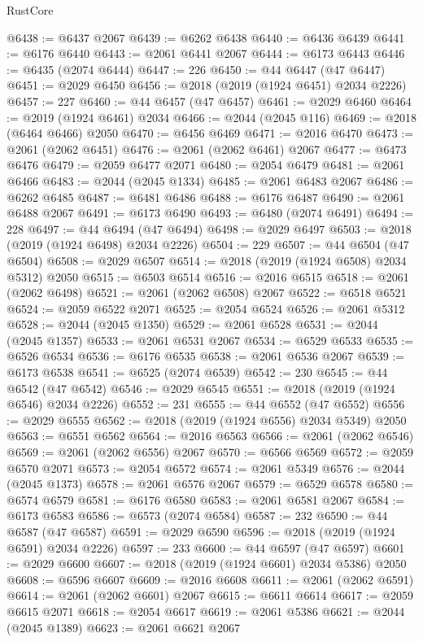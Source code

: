 \begin{lexlean}{RustCore}
\begin{coremodule}
@6438 := @6437 @2067
@6439 := @6262 @6438
@6440 := @6436 @6439
@6441 := @6176 @6440
@6443 := @2061 @6441 @2067
@6444 := @6173 @6443
@6446 := @6435 (@2074 @6444)
@6447 := 226
@6450 := @44 @6447 (@47 @6447)
@6451 := @2029 @6450
@6456 := @2018 (@2019 (@1924 @6451) @2034 @2226)
@6457 := 227
@6460 := @44 @6457 (@47 @6457)
@6461 := @2029 @6460
@6464 := @2019 (@1924 @6461) @2034
@6466 := @2044 (@2045 @116)
@6469 := @2018 (@6464 @6466) @2050
@6470 := @6456 @6469
@6471 := @2016 @6470
@6473 := @2061 (@2062 @6451)
@6476 := @2061 (@2062 @6461) @2067
@6477 := @6473 @6476
@6479 := @2059 @6477 @2071
@6480 := @2054 @6479
@6481 := @2061 @6466
@6483 := @2044 (@2045 @1334)
@6485 := @2061 @6483 @2067
@6486 := @6262 @6485
@6487 := @6481 @6486
@6488 := @6176 @6487
@6490 := @2061 @6488 @2067
@6491 := @6173 @6490
@6493 := @6480 (@2074 @6491)
@6494 := 228
@6497 := @44 @6494 (@47 @6494)
@6498 := @2029 @6497
@6503 := @2018 (@2019 (@1924 @6498) @2034 @2226)
@6504 := 229
@6507 := @44 @6504 (@47 @6504)
@6508 := @2029 @6507
@6514 := @2018 (@2019 (@1924 @6508) @2034 @5312) @2050
@6515 := @6503 @6514
@6516 := @2016 @6515
@6518 := @2061 (@2062 @6498)
@6521 := @2061 (@2062 @6508) @2067
@6522 := @6518 @6521
@6524 := @2059 @6522 @2071
@6525 := @2054 @6524
@6526 := @2061 @5312
@6528 := @2044 (@2045 @1350)
@6529 := @2061 @6528
@6531 := @2044 (@2045 @1357)
@6533 := @2061 @6531 @2067
@6534 := @6529 @6533
@6535 := @6526 @6534
@6536 := @6176 @6535
@6538 := @2061 @6536 @2067
@6539 := @6173 @6538
@6541 := @6525 (@2074 @6539)
@6542 := 230
@6545 := @44 @6542 (@47 @6542)
@6546 := @2029 @6545
@6551 := @2018 (@2019 (@1924 @6546) @2034 @2226)
@6552 := 231
@6555 := @44 @6552 (@47 @6552)
@6556 := @2029 @6555
@6562 := @2018 (@2019 (@1924 @6556) @2034 @5349) @2050
@6563 := @6551 @6562
@6564 := @2016 @6563
@6566 := @2061 (@2062 @6546)
@6569 := @2061 (@2062 @6556) @2067
@6570 := @6566 @6569
@6572 := @2059 @6570 @2071
@6573 := @2054 @6572
@6574 := @2061 @5349
@6576 := @2044 (@2045 @1373)
@6578 := @2061 @6576 @2067
@6579 := @6529 @6578
@6580 := @6574 @6579
@6581 := @6176 @6580
@6583 := @2061 @6581 @2067
@6584 := @6173 @6583
@6586 := @6573 (@2074 @6584)
@6587 := 232
@6590 := @44 @6587 (@47 @6587)
@6591 := @2029 @6590
@6596 := @2018 (@2019 (@1924 @6591) @2034 @2226)
@6597 := 233
@6600 := @44 @6597 (@47 @6597)
@6601 := @2029 @6600
@6607 := @2018 (@2019 (@1924 @6601) @2034 @5386) @2050
@6608 := @6596 @6607
@6609 := @2016 @6608
@6611 := @2061 (@2062 @6591)
@6614 := @2061 (@2062 @6601) @2067
@6615 := @6611 @6614
@6617 := @2059 @6615 @2071
@6618 := @2054 @6617
@6619 := @2061 @5386
@6621 := @2044 (@2045 @1389)
@6623 := @2061 @6621 @2067

\end{coremodule}
\end{lexlean}
